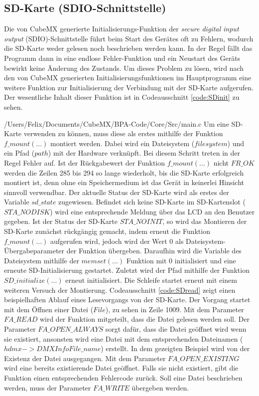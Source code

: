 
\subsection{SD-Karte (SDIO-Schnittstelle)}

Die von CubeMX generierte Initialisierungs-Funktion der \textit{secure digital input output} (SDIO)-Schnittstelle führt beim Start des Gerätes oft zu Fehlern, wodurch die SD-Karte weder gelesen noch beschrieben werden kann. In der Regel fällt das Programm dann in eine endlose Fehler-Funktion und ein Neustart des Geräts bewirkt keine Änderung des Zustands. Um dieses Problem zu lösen, wird nach den von CubeMX generierten Initialisierungsfunktionen im Hauptprogramm eine weitere Funktion zur Initialisierung der Verbindung mit der SD-Karte aufgerufen. Der wesentliche Inhalt dieser Funktion ist in Codeausschnitt \ref{code:SDinit} zu sehen.

{/Users/Felix/Documents/CubeMX/BPA-Code/Core/Src/main.c}
Um eine SD-Karte verwenden zu können, muss diese als erstes mithilfe der Funktion $f\_mount(...)$ montiert werden. Dabei wird ein Dateisystem ($filesystem$) und ein Pfad ($path$) mit der Hardware verknüpft. Bei diesem Schritt treten in der Regel Fehler auf. Ist der Rückgabewert der Funktion $f\_mount(...)$ nicht $FR\_OK$ werden die Zeilen 285 bis 294 so lange wiederholt, bis die SD-Karte erfolgreich montiert ist, denn ohne ein Speichermedium ist das Gerät in keinerlei Hinsicht sinnvoll verwendbar. Der aktuelle Status der SD-Karte wird als erstes der Variable $sd\_state$ zugewiesen. Befindet sich keine SD-Karte im SD-Kartenslot ($STA\_NODISK$) wird eine entsprechende Meldung über das LCD an den Benutzer gegeben. Ist der Status der SD-Karte $STA\_NOINIT$, so wird das Montieren der SD-Karte zunächst rückgängig gemacht, indem erneut die Funktion $f\_mount(...)$ aufgerufen wird, jedoch wird der Wert 0 als Dateisystem-Übergabeparameter der Funktion übergeben. Daraufhin wird die Variable des Dateisystem mithilfe der $memset(...)$ Funktion mit 0 initialisiert und eine erneute SD-Initialisierung gestartet. Zuletzt wird der Pfad mithilfe der Funktion $SD\_initialize(...)$ erneut initialisiert. Die Schleife startet erneut mit einem weiteren Versuch der Montierung.
\newline
Codeausschnitt \ref{code:SDread} zeigt einen beispielhaften Ablauf eines Lesevorgangs von der SD-Karte. Der Vorgang startet mit dem Öffnen einer Datei ($File$), zu sehen in Zeile 1009. Mit dem Parameter $FA\_READ$ wird der Funktion mitgeteilt, dass die Datei gelesen werden soll. Der Parameter $FA\_OPEN\_ALWAYS$ sorgt dafür, dass die Datei geöffnet wird wenn sie existiert, ansonsten wird eine Datei mit dem entsprechenden Dateinamen ($hdmx->DMXInfoFile\_name$) erstellt. In dem gezeigten Beispiel wird von der Existenz der Datei ausgegangen. Mit dem Parameter $FA\_OPEN\_EXISTING$ wird eine bereits existierende Datei geöffnet. Falls sie nicht existiert, gibt die Funktion einen entsprechenden Fehlercode zurück. Soll eine Datei beschrieben werden, muss der Parameter $FA\_WRITE$ übergeben werden.
